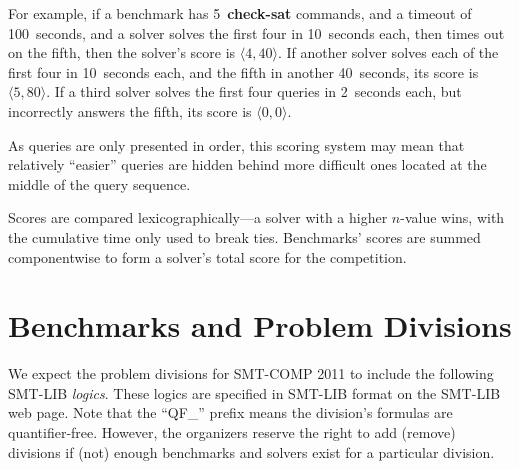 \documentclass[12pt]{article}
\newcommand{\akey}[1]{\textbf{#1}}
\begin{document}
For example, if a benchmark has 5~\akey{check-sat} commands, and a
timeout of 100~seconds, and a solver solves the first four in
10~seconds each, then times out on the fifth, then the solver's score
is $\langle4,40\rangle$.  If another solver solves each of the first
four in 10~seconds each, and the fifth in another 40~seconds, its
score is $\langle5,80\rangle$.  If a third solver solves the first
four queries in 2~seconds each, but incorrectly answers the fifth, its
score is $\langle0,0\rangle$.

As queries are only presented in order, this scoring system may mean
that relatively ``easier'' queries are hidden behind more difficult
ones located at the middle of the query sequence.

Scores are compared lexicographically---a solver with a higher
$n$-value wins, with the cumulative time only used to break ties.
Benchmarks' scores are summed componentwise to form a solver's total
score for the competition.

\section{Benchmarks and Problem Divisions}
\label{sec:theories}


We expect the problem divisions for SMT-COMP 2011 to include the following
SMT-LIB \emph{logics}.  These logics are specified in SMT-LIB format on the
SMT-LIB web page.  Note that the ``QF\_'' prefix means the division's
formulas are quantifier-free.  However, the organizers reserve the right to add
(remove) divisions if (not) enough benchmarks and solvers exist for a
particular division.
\end{document}
